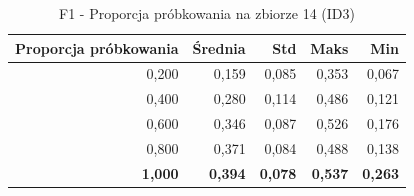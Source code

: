 \begin{table}[htbp]
\centering
\small
\setlength{\tabcolsep}{6pt}
\renewcommand{\arraystretch}{1.2}
\caption{F1 - Proporcja próbkowania na zbiorze 14 (ID3)}
\label{tab:ID3_sample_ratio_14_f1}
\begin{tabular}{r|r|r|r|r}
\toprule
Proporcja próbkowania & Średnia & Std & Maks & Min \\
\hline
0,200 & 0,159 & 0,085 & 0,353 & 0,067 \\
0,400 & 0,280 & 0,114 & 0,486 & 0,121 \\
0,600 & 0,346 & 0,087 & 0,526 & 0,176 \\
0,800 & 0,371 & 0,084 & 0,488 & 0,138 \\
\textbf{1,000} & \textbf{0,394} & \textbf{0,078} & \textbf{0,537} & \textbf{0,263} \\
\bottomrule
\end{tabular}
\end{table}